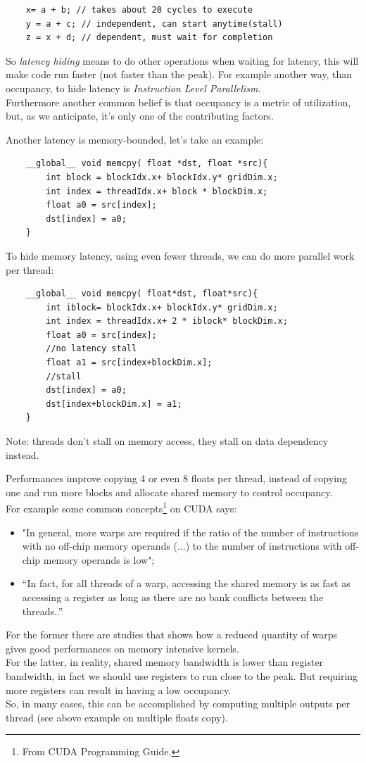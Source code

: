\begin{lstlisting}
	x= a + b; // takes about 20 cycles to execute
	y = a + c; // independent, can start anytime(stall)
	z = x + d; // dependent, must wait for completion
\end{lstlisting}
So \textit{latency hiding} means to do other operations when waiting for latency, this will make code run faster (not faster than the peak). For example another way, than occupancy, to hide latency is \textit{Instruction Level Parallelism}.\\
Furthermore another common belief is that occupancy is a metric of utilization, but, as we anticipate, it's only one of the contributing factors.

Another latency is memory-bounded, let's take an example:
\begin{lstlisting}
	__global__ void memcpy( float *dst, float *src){
		int block = blockIdx.x+ blockIdx.y* gridDim.x;
		int index = threadIdx.x+ block * blockDim.x;
		float a0 = src[index];
		dst[index] = a0;
	}
\end{lstlisting}
To hide memory latency, using even fewer threads, we can do more parallel work per thread:
\begin{lstlisting}
	__global__ void memcpy( float*dst, float*src){
		int iblock= blockIdx.x+ blockIdx.y* gridDim.x;
		int index = threadIdx.x+ 2 * iblock* blockDim.x;
		float a0 = src[index]; 
		//no latency stall
		float a1 = src[index+blockDim.x]; 
		//stall
		dst[index] = a0;
		dst[index+blockDim.x] = a1;
	}
\end{lstlisting}
Note: threads don't stall on memory access, they stall on data dependency instead.

Performances improve copying 4 or even 8 floats per thread, instead of copying one and run more blocks and allocate shared memory to control occupancy.\\
For example some common concepts\footnote{From CUDA Programming Guide.} on CUDA says:
\begin{itemize}
\item "In general, more warps are required if the ratio of the number of instructions with no off-chip memory operands (...) to the number of instructions with off-chip memory operands is low";  %
\item “In fact, for all threads of a warp, accessing the shared memory is as fast as accessing a register as long as there are no bank conflicts between the threads..” 
\end{itemize}
For the former there are studies that shows how a reduced quantity of warps gives good performances on memory intensive kernels.\\
For the latter, in reality, shared memory bandwidth is lower than register bandwidth, in fact we should use registers to run close to the peak.
But requiring more registers can result in having a low occupancy.\\
So, in many cases, this can be accomplished by computing multiple outputs per thread (see above example on multiple floats copy)\cite{loweroccupancy}.

